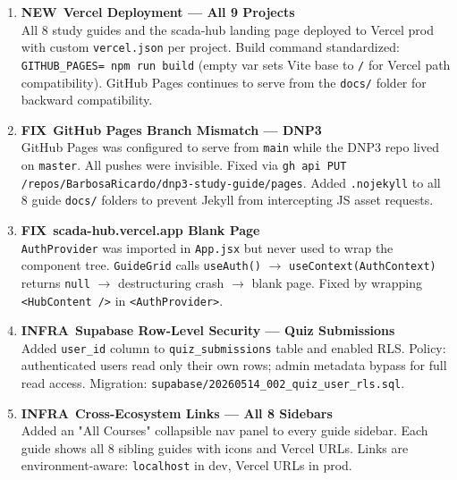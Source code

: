 \documentclass[10pt]{article}
\newcommand{\feat}{\textcolor{sgreen}{\small\bfseries NEW}}
\newcommand{\fix}{\textcolor{sblue}{\small\bfseries FIX}}
\newcommand{\infra}{\textcolor{samber}{\small\bfseries INFRA}}
\begin{document}
\begin{enumerate}\small
  \item \feat\ \textbf{Vercel Deployment — All 9 Projects} \\
    All 8 study guides and the scada-hub landing page deployed to Vercel prod with custom \texttt{vercel.json} per project. Build command standardized: \texttt{GITHUB\_PAGES= npm run build} (empty var sets Vite base to \texttt{/} for Vercel path compatibility). GitHub Pages continues to serve from the \texttt{docs/} folder for backward compatibility.

  \item \fix\ \textbf{GitHub Pages Branch Mismatch — DNP3} \\
    GitHub Pages was configured to serve from \texttt{main} while the DNP3 repo lived on \texttt{master}. All pushes were invisible. Fixed via \texttt{gh api PUT /repos/BarbosaRicardo/dnp3-study-guide/pages}. Added \texttt{.nojekyll} to all 8 guide \texttt{docs/} folders to prevent Jekyll from intercepting JS asset requests.

  \item \fix\ \textbf{scada-hub.vercel.app Blank Page} \\
    \texttt{AuthProvider} was imported in \texttt{App.jsx} but never used to wrap the component tree. \texttt{GuideGrid} calls \texttt{useAuth()} $\to$ \texttt{useContext(AuthContext)} returns \texttt{null} $\to$ destructuring crash $\to$ blank page. Fixed by wrapping \texttt{<HubContent />} in \texttt{<AuthProvider>}.

  \item \infra\ \textbf{Supabase Row-Level Security — Quiz Submissions} \\
    Added \texttt{user\_id} column to \texttt{quiz\_submissions} table and enabled RLS. Policy: authenticated users read only their own rows; admin metadata bypass for full read access. Migration: \texttt{supabase/20260514\_002\_quiz\_user\_rls.sql}.

  \item \infra\ \textbf{Cross-Ecosystem Links — All 8 Sidebars} \\
    Added an "All Courses" collapsible nav panel to every guide sidebar. Each guide shows all 8 sibling guides with icons and Vercel URLs. Links are environment-aware: \texttt{localhost} in dev, Vercel URLs in prod.
\end{enumerate}
\end{document}
